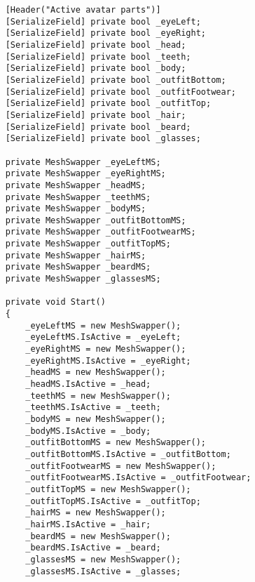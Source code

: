 \begin{verbatim}
    [Header("Active avatar parts")]
    [SerializeField] private bool _eyeLeft;
    [SerializeField] private bool _eyeRight;
    [SerializeField] private bool _head;
    [SerializeField] private bool _teeth;
    [SerializeField] private bool _body;
    [SerializeField] private bool _outfitBottom;
    [SerializeField] private bool _outfitFootwear;
    [SerializeField] private bool _outfitTop;
    [SerializeField] private bool _hair;
    [SerializeField] private bool _beard;
    [SerializeField] private bool _glasses;

    private MeshSwapper _eyeLeftMS;
    private MeshSwapper _eyeRightMS;
    private MeshSwapper _headMS;
    private MeshSwapper _teethMS;
    private MeshSwapper _bodyMS;
    private MeshSwapper _outfitBottomMS;
    private MeshSwapper _outfitFootwearMS;
    private MeshSwapper _outfitTopMS;
    private MeshSwapper _hairMS;
    private MeshSwapper _beardMS;
    private MeshSwapper _glassesMS;

    private void Start()
    {
        _eyeLeftMS = new MeshSwapper();
        _eyeLeftMS.IsActive = _eyeLeft;
        _eyeRightMS = new MeshSwapper();
        _eyeRightMS.IsActive = _eyeRight;
        _headMS = new MeshSwapper();
        _headMS.IsActive = _head;
        _teethMS = new MeshSwapper();
        _teethMS.IsActive = _teeth;
        _bodyMS = new MeshSwapper();
        _bodyMS.IsActive = _body;
        _outfitBottomMS = new MeshSwapper();
        _outfitBottomMS.IsActive = _outfitBottom;
        _outfitFootwearMS = new MeshSwapper();
        _outfitFootwearMS.IsActive = _outfitFootwear;
        _outfitTopMS = new MeshSwapper();
        _outfitTopMS.IsActive = _outfitTop;
        _hairMS = new MeshSwapper();
        _hairMS.IsActive = _hair;
        _beardMS = new MeshSwapper();
        _beardMS.IsActive = _beard;
        _glassesMS = new MeshSwapper();
        _glassesMS.IsActive = _glasses;


\end{verbatim}
